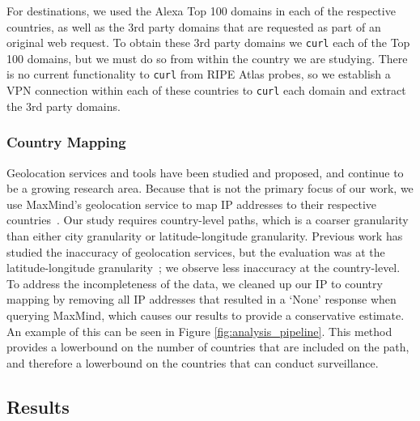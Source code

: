 For destinations, we used the Alexa Top 100 domains in each of the respective countries, as well as the 3rd party domains that are requested as part of an original web request.  To obtain these 3rd party domains we {\tt curl} each of the Top 100 domains, but we must do so from within the country we are studying.  There is no current functionality to {\tt curl} from RIPE Atlas probes, so we establish a VPN connection within each of these countries to {\tt curl} each domain and extract the 3rd party domains.

\subsubsection{Country Mapping}
\label{c_map}
Geolocation services and tools have been studied and proposed, and continue to be a growing research area.  Because that is not the primary focus of our work, we use MaxMind's geolocation service to map IP addresses to their respective countries~\cite{maxmind}.   Our study requires country-level paths, which is a coarser granularity than either city granularity or latitude-longitude granularity.  Previous work has studied the inaccuracy of geolocation services, but the evaluation was at the latitude-longitude granularity~\cite{huffaker2011geocompare}; we observe less inaccuracy at the country-level.  To address the incompleteness of the data, we cleaned up our IP to country mapping by removing all IP addresses that resulted in a `None' response when querying MaxMind, which causes our results to provide a conservative estimate.  An example of this can be seen in Figure \ref{fig:analysis_pipeline}.  This method provides a lowerbound on the number of countries that are included on the path, and therefore a lowerbound on the countries that can conduct surveillance.  

\subsection{Results}

